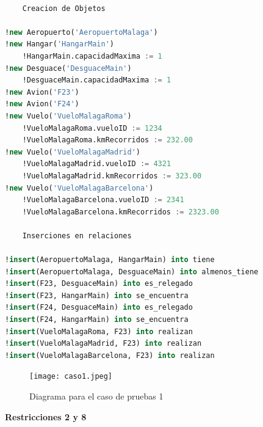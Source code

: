 \documentclass[12pt.a4paper]{article}
\begin{document}
\vspace{2.0 cm}
\begin{lstlisting}[style = useNormal,language=SQL, caption={Codigo de pruebas 1}] 

    Creacion de Objetos
    
!new Aeropuerto('AeropuertoMalaga')
!new Hangar('HangarMain')
    !HangarMain.capacidadMaxima := 1
!new Desguace('DesguaceMain')
    !DesguaceMain.capacidadMaxima := 1
!new Avion('F23')
!new Avion('F24')
!new Vuelo('VueloMalagaRoma')
    !VueloMalagaRoma.vueloID := 1234
    !VueloMalagaRoma.kmRecorridos := 232.00
!new Vuelo('VueloMalagaMadrid')
    !VueloMalagaMadrid.vueloID := 4321
    !VueloMalagaMadrid.kmRecorridos := 323.00
!new Vuelo('VueloMalagaBarcelona')
    !VueloMalagaBarcelona.vueloID := 2341
    !VueloMalagaBarcelona.kmRecorridos := 2323.00
    
    Inserciones en relaciones
    
!insert(AeropuertoMalaga, HangarMain) into tiene
!insert(AeropuertoMalaga, DesguaceMain) into almenos_tiene
!insert(F23, DesguaceMain) into es_relegado
!insert(F23, HangarMain) into se_encuentra
!insert(F24, DesguaceMain) into es_relegado
!insert(F24, HangarMain) into se_encuentra
!insert(VueloMalagaRoma, F23) into realizan
!insert(VueloMalagaMadrid, F23) into realizan
!insert(VueloMalagaBarcelona, F23) into realizan

\end{lstlisting}
\begin{figure}[H]
     \texttt{[image: caso1.jpeg]}
     \caption{Diagrama para el caso de pruebas 1}
     \label{Diagrama del sistema de aviacion}
\end{figure}
\vspace{0.5 cm}
\textbf{Restricciones 2 y 8}
\end{document}
